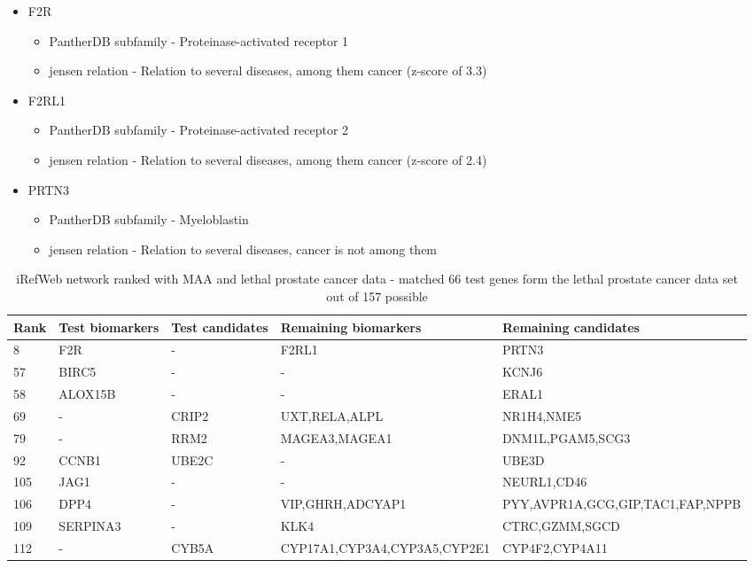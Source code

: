 \begin{itemize}
    \item F2R
        \begin{itemize}
            \item PantherDB subfamily - Proteinase-activated receptor 1
            \item \gls{jensen} relation -  Relation to several diseases, among
                them cancer (z-score of 3.3)
        \end{itemize}
    \item F2RL1
        \begin{itemize}
            \item PantherDB subfamily - Proteinase-activated receptor 2
            \item \gls{jensen} relation - Relation to several diseases, among
                them cancer (z-score of 2.4)
        \end{itemize}
    \item PRTN3
        \begin{itemize}
            \item PantherDB subfamily - Myeloblastin
            \item \gls{jensen} relation - Relation to several diseases, cancer
                is not among them
        \end{itemize}
\end{itemize}

\begin{sidewaystable}
    \begin{tabular}{|l|l|l|l|l|}
        \hline
        \textbf{Rank}
        & \textbf{Test biomarkers}
        & \textbf{Test candidates}
        & \textbf{Remaining biomarkers}
        & \textbf{Remaining candidates} \\
        \hline
        8	& F2R	& -	& F2RL1	& PRTN3 \\
        \hline
        57	& BIRC5	& -	& -	& KCNJ6 \\
        \hline
        58	& ALOX15B	& -	& -	& ERAL1 \\
        \hline
        69	& -	& CRIP2	& UXT,RELA,ALPL	& NR1H4,NME5 \\
        \hline
        79	& -	& RRM2	& MAGEA3,MAGEA1	& DNM1L,PGAM5,SCG3 \\
        \hline
        92	& CCNB1	& UBE2C	& -	& UBE3D \\
        \hline
        105	& JAG1	& -	& -	& NEURL1,CD46 \\
        \hline
        106	& DPP4	& -	& VIP,GHRH,ADCYAP1	& PYY,AVPR1A,GCG,GIP,TAC1,FAP,NPPB \\
        \hline
        109	& SERPINA3	& -	& KLK4	& CTRC,GZMM,SGCD \\
        \hline
        112	& -	& CYB5A	& CYP17A1,CYP3A4,CYP3A5,CYP2E1	& CYP4F2,CYP4A11 \\
        \hline
    \end{tabular}
    \caption{iRefWeb network ranked with MAA and lethal prostate cancer data
    - matched 66 test genes form the lethal prostate cancer data set out of 157
possible}
    \label{tab:maa-lethal}
\end{sidewaystable}

